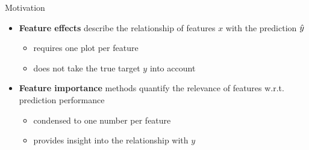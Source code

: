	
	
	

	

\begin{frame}{Motivation}
\begin{itemize}
  \item \textbf{Feature effects} describe the relationship of features $x$ with the prediction $\yh$
  \begin{itemize}
    \item requires one plot per feature
    \item does not take the true target $y$ into account
  \end{itemize}
  \item \textbf{Feature importance} methods quantify the relevance of features w.r.t. prediction performance
  \begin{itemize}
    \item condensed to one number per feature
    \item provides insight into the relationship with $y$
  \end{itemize}
\end{itemize}
\end{frame}

